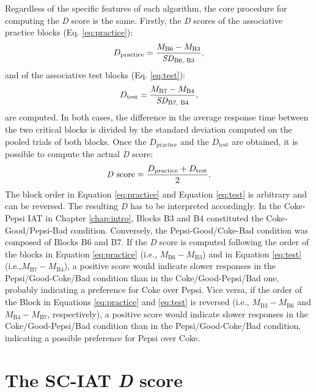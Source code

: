 \documentclass[12pt]{book}
\begin{document}
Regardless of the specific features of each algorithm, the core procedure for computing the \emph{D} score is the same. Firstly, the \emph{D} scores of the associative practice blocks (Eq. \ref{eq:practice}):
%
\begin{equation}\label{eq:practice}
	D_{\text{practice}} = \frac{M_{\text{B6}} - M_{\text{B3}}}{\text{\emph{SD}}_{\text{B6, B3}}}, 
\end{equation}
%
and of the associative test blocks (Eq. \ref{eq:test}):
%
\begin{equation}\label{eq:test}
	D_{\text{test}} = \frac{M_{\text{B7}} - M_{\text{B4}}}{\text{\emph{SD}}_{\text{B7, B4}}},
\end{equation}
are computed.
In both cases, the difference in the average response time between the two critical blocks is divided by the standard deviation computed on the pooled trials of both blocks. Once the $D_{\text{practice}}$ and the $D_{\text{test}}$ are obtained, it is possible to compute the actual \emph{D} score: 
%
\begin{equation}\label{eq:dscore}
	\text{\emph{D} score} = \frac{D_{\text{practice}} + D_{\text{test}}}{2}.
\end{equation}
The block order in Equation \ref{eq:practice} and Equation \ref{eq:test} is arbitrary and can be reversed. The resulting \emph{D} has to be interpreted accordingly. 
In the Coke-Pepsi IAT in Chapter \ref{chap:intro}, Blocks B3 and B4 constituted the Coke-Good/Pepsi-Bad condition. 
Conversely, the Pepsi-Good/Coke-Bad condition was composed of Blocks B6 and B7.
If the \emph{D} score is computed following the order of the blocks in Equation \ref{eq:practice} (i.e., $M_{\text{B6}} - M_{\text{B3}}$) and in Equation \ref{eq:test} (i.e.,$M_{\text{B7}} - M_{\text{B4}}$), a positive score would indicate slower responses in the Pepsi/Good-Coke/Bad condition than in the Coke/Good-Pepsi/Bad one, probably indicating a preference for Coke over Pepsi. Vice versa, if the order of the Block in Equations \ref{eq:practice} and \ref{eq:test} is reversed (i.e., $M_{\text{B3}} - M_{\text{B6}}$ and $M_{\text{B4}} - M_{\text{B7}}$, respectively), a positive score would indicate slower responses in the Coke/Good-Pepsi/Bad condition than in the Pepsi/Good-Coke/Bad condition, indicating a possible preference for Pepsi over Coke.


\section{The SC-IAT \emph{D} score}\label{sec:sciatD}
\end{document}
